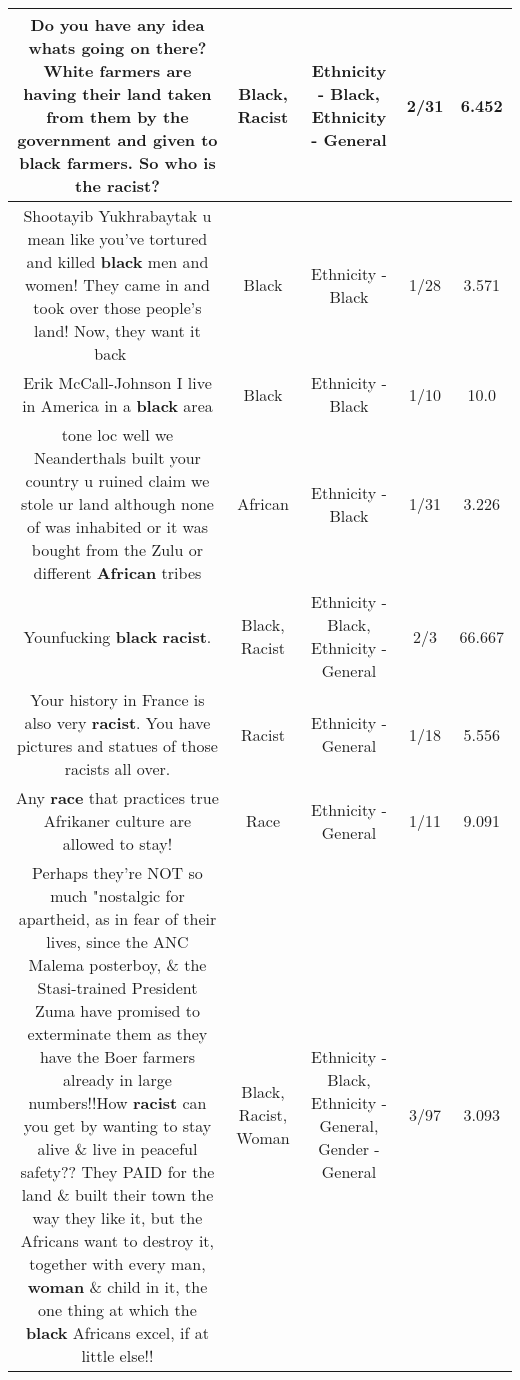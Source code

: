 \documentclass[11pt]{article}
\newlength\mylength
\begin{document}
\begin{center}
\begin{longtable}{|C{.65\mylength}|C{.30\mylength}|C{.12\mylength}|C{.12\mylength}|C{.12\mylength}|}
  \small Do you have any idea whats going on there? White farmers are having their land taken from them by the government and given to \textbf{black} farmers. So who is the \textbf{racist}?\normalsize   & Black, Racist & Ethnicity - Black, Ethnicity - General & 2/31 & 6.452 \\  \hline
  \small Shootayib Yukhrabaytak u mean like you've tortured and killed \textbf{black} men and women! They came in and took over those people's land! Now, they want it back 👊🏿\normalsize   & Black & Ethnicity - Black & 1/28 & 3.571 \\  \hline
  \small Erik McCall-Johnson I live in America in a \textbf{black} area\normalsize   & Black & Ethnicity - Black & 1/10 & 10.0 \\  \hline
  \small tone loc well we Neanderthals built your country u ruined claim we stole ur land although none of was inhabited or it was bought from the Zulu or different \textbf{African} tribes\normalsize   & African & Ethnicity - Black & 1/31 & 3.226 \\  \hline
  \small Younfucking \textbf{black} \textbf{racist}.\normalsize   & Black, Racist & Ethnicity - Black, Ethnicity - General & 2/3 & 66.667 \\  \hline
  \small Your history in France is also very \textbf{racist}. You have pictures and statues of those racists all over.\normalsize   & Racist & Ethnicity - General & 1/18 & 5.556 \\  \hline
  \small Any \textbf{race} that practices true Afrikaner culture are allowed to stay!\normalsize   & Race & Ethnicity - General & 1/11 & 9.091 \\  \hline
  \small Perhaps they're NOT so much "nostalgic for apartheid, as in fear of their lives, since the ANC Malema posterboy, \& the Stasi-trained President Zuma have promised to exterminate them as they have the Boer farmers already in large numbers!!How \textbf{racist} can you get by wanting to stay alive \& live in peaceful safety?? They PAID for the land \& built their town the way they like it, but the Africans want to destroy it, together with every man, \textbf{woman} \& child in it, the one thing at which the \textbf{black} Africans excel, if at little else!!\normalsize   & Black, Racist, Woman & Ethnicity - Black, Ethnicity - General, Gender - General & 3/97 & 3.093 \\  \hline

\end{longtable}
\end{center}
\end{document}
